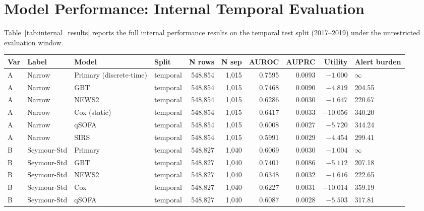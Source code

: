 \section{Model Performance: Internal Temporal Evaluation}
\label{sec:internal_performance}

Table~\ref{tab:internal_results} reports the full internal performance results
on the temporal test split (2017--2019) under the unrestricted evaluation window.

\begin{landscape}
\begin{longtable}{llllrrrrrl}
  \toprule
  \textbf{Var} & \textbf{Label} & \textbf{Model} & \textbf{Split}
    & \textbf{N rows} & \textbf{N sep}
    & \textbf{AUROC} & \textbf{AUPRC}
    & \textbf{Utility} & \textbf{Alert burden} \\
  \midrule
  \endhead
  A & Narrow & Primary (discrete-time) & temporal & 548{,}854 & 1{,}015
    & 0.7595 & 0.0093 & $-1.000$ & $\infty$ \\
  A & Narrow & GBT                     & temporal & 548{,}854 & 1{,}015
    & 0.7468 & 0.0090 & $-4.819$ & 204.55 \\
  A & Narrow & NEWS2                   & temporal & 548{,}854 & 1{,}015
    & 0.6286 & 0.0030 & $-1.647$ & 220.67 \\
  A & Narrow & Cox (static)            & temporal & 548{,}854 & 1{,}015
    & 0.6417 & 0.0033 & $-10.056$ & 340.20 \\
  A & Narrow & qSOFA                   & temporal & 548{,}854 & 1{,}015
    & 0.6008 & 0.0027 & $-5.720$ & 344.24 \\
  A & Narrow & SIRS                    & temporal & 548{,}854 & 1{,}015
    & 0.5991 & 0.0029 & $-4.454$ & 299.41 \\
  \midrule
  B & Seymour-Std & Primary & temporal & 548{,}827 & 1{,}040
    & 0.6069 & 0.0030 & $-1.004$ & $\infty$ \\
  B & Seymour-Std & GBT     & temporal & 548{,}827 & 1{,}040
    & 0.7401 & 0.0086 & $-5.112$ & 207.18 \\
  B & Seymour-Std & NEWS2   & temporal & 548{,}827 & 1{,}040
    & 0.6348 & 0.0032 & $-1.616$ & 222.65 \\
  B & Seymour-Std & Cox     & temporal & 548{,}827 & 1{,}040
    & 0.6227 & 0.0031 & $-10.014$ & 359.19 \\
  B & Seymour-Std & qSOFA  & temporal & 548{,}827 & 1{,}040
    & 0.6087 & 0.0028 & $-5.503$ & 317.81 \\

\end{longtable}
\end{landscape}
